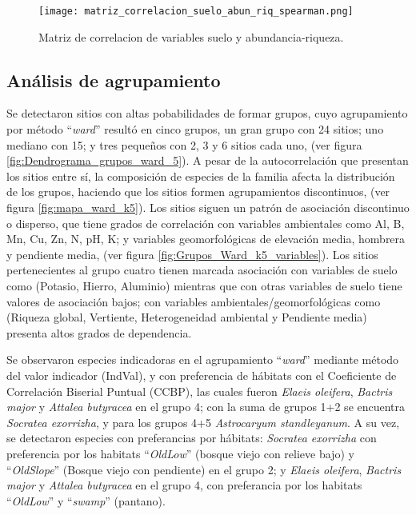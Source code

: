 \documentclass[11pt,]{article}
\begin{document}
\begin{figure}
\centering
\texttt{[image: matriz\_correlacion\_suelo\_abun\_riq\_spearman.png]}
\caption{Matriz de correlacion de variables suelo y abundancia-riqueza.
\label{fig:matriz_correlacion_suelo_abun_riq_spearman}}
\end{figure}

\subsection{Análisis de
agrupamiento}\label{anuxe1lisis-de-agrupamiento-1}

Se detectaron sitios con altas pobabilidades de formar grupos, cuyo
agrupamiento por método ``\emph{ward}'' resultó en cinco grupos, un gran
grupo con 24 sitios; uno mediano con 15; y tres pequeños con 2, 3 y 6
sitios cada uno, (ver figura \ref{fig:Dendrograma_grupos_ward_5}). A
pesar de la autocorrelación que presentan los sitios entre sí, la
composición de especies de la familia afecta la distribución de los
grupos, haciendo que los sitios formen agrupamientos discontinuos, (ver
figura \ref{fig:mapa_ward_k5}). Los sitios siguen un patrón de
asociación discontinuo o disperso, que tiene grados de correlación con
variables ambientales como Al, B, Mn, Cu, Zn, N, pH, K; y variables
geomorfológicas de elevación media, hombrera y pendiente media, (ver
figura \ref{fig:Grupos_Ward_k5_variables}). Los sitios pertenecientes al
grupo cuatro tienen marcada asociación con variables de suelo como
(Potasio, Hierro, Aluminio) mientras que con otras variables de suelo
tiene valores de asociación bajos; con variables
ambientales/geomorfológicas como (Riqueza global, Vertiente,
Heterogeneidad ambiental y Pendiente media) presenta altos grados de
dependencia.

Se observaron especies indicadoras en el agrupamiento ``\emph{ward}''
mediante método del valor indicador (IndVal), y con preferencia de
hábitats con el Coeficiente de Correlación Biserial Puntual (CCBP), las
cuales fueron \emph{Elaeis oleifera}, \emph{Bactris major} y
\emph{Attalea butyracea} en el grupo 4; con la suma de grupos 1+2 se
encuentra \emph{Socratea exorrizha}, y para los grupos 4+5
\emph{Astrocaryum standleyanum}. A su vez, se detectaron especies con
preferancias por hábitats: \emph{Socratea exorrizha} con preferencia por
los habitats ``\emph{OldLow}'' (bosque viejo con relieve bajo) y
``\emph{OldSlope}'' (Bosque viejo con pendiente) en el grupo 2; y
\emph{Elaeis oleifera}, \emph{Bactris major} y \emph{Attalea butyracea}
en el grupo 4, con preferancia por los habitats ``\emph{OldLow}'' y
``\emph{swamp}'' (pantano).
\end{document}
